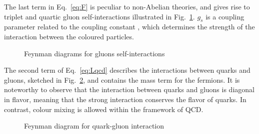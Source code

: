 The last term in Eq.~\ref{eq:F} is peculiar to non-Abelian theories, and gives rise to triplet and quartic gluon self-interactions illustrated in Fig.~\ref{fig:Feynman-gluons}. $g_s$ is a coupling parameter related to the coupling constant \als, which determines the strength of the interaction between the coloured particles.

\begin{figure}[htb]
    \centering
     \qquad
    \caption{Feynman diagrams for gluons self-interactions}
    \label{fig:Feynman-gluons}
\end{figure}

The second term of Eq.~\ref{eq:Lqcd} describes the interactions between quarks and gluons, sketched in Fig.~\ref{fig:Feynman_q_g}, and contains the mass term for the fermions. It is noteworthy to observe that the interaction between quarks and gluons is diagonal in flavor, meaning that the strong interaction conserves the flavor of quarks. In contrast, colour mixing is allowed within the framework of QCD.

\begin{figure}[htb]
    \centering
    \caption{Feynman diagram for quark-gluon interaction}
    \label{fig:Feynman_q_g}
\end{figure}

